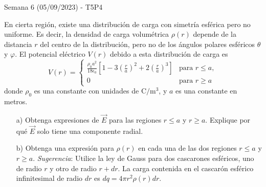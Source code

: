 \begin{frame}{Semana 6 (05/09/2023) - T5P4}

En cierta región, existe una distribución de carga
con simetría esférica pero no uniforme. Es decir, la densidad de carga volumétrica $\rho(r)$ depende de la distancia $r$ del centro de la distribución, pero no de los ángulos polares esféricos $\theta$ y $\varphi$. El potencial eléctrico $V(r)$ debido a esta distribución de carga es $$
V(r)=\left\{\begin{matrix}
\frac{\rho_0a^2}{18\epsilon_0}\left[ 1-3\left(\frac{r}{a}\right)^2+2\left(\frac{r}{a}\right)^3 \right] & \text{para }r\leq a,
\\ 
0& \text{para }r\geq a
\end{matrix}\right.
$$
donde $\rho_0$ es una constante con unidades de $\text{C}/\text{m}^3$, y $a$ es una constante en metros. \begin{itemize}
    \item[a)] Obtenga expresiones de $\vec{E}$ para las regiones $r\leq a$ y $r\geq a$. Explique por qué $\vec{E}$ solo tiene una componente radial.
    
    \item[b)] Obtenga una expresión para $\rho(r)$ en cada una de las dos regiones $r\leq a$ y $r\geq a$. \textit{Sugerencia}: Utilice la ley de Gauss para dos cascarones esféricos, uno de radio $r$ y otro de radio $r+dr$. La carga contenida en el cascarón esférico infinitesimal de radio $dr$ es $dq = 4\pi r^2\rho(r)dr$.
\end{itemize}

\end{frame}


